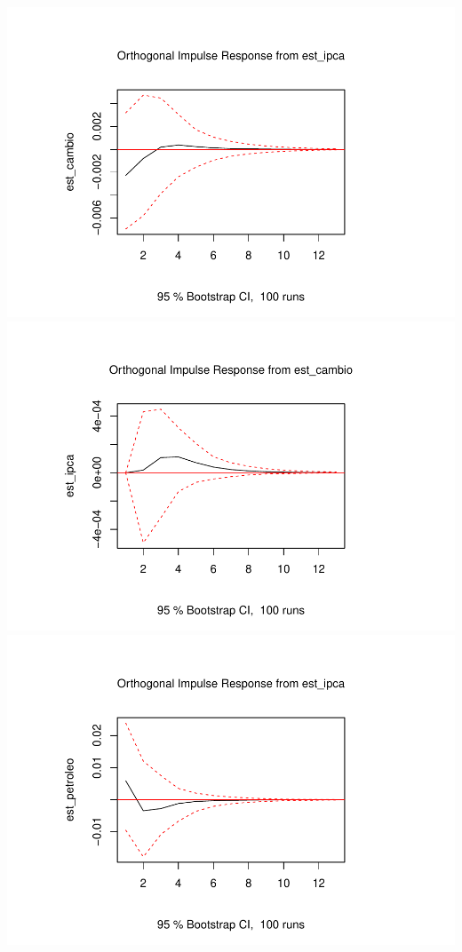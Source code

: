 \documentclass[12pt]{article}
\begin{document}
\includegraphics{teste_en_files/figure-latex/unnamed-chunk-14-1.pdf}
\includegraphics{teste_en_files/figure-latex/unnamed-chunk-14-2.pdf}
\includegraphics{teste_en_files/figure-latex/unnamed-chunk-14-3.pdf}
\end{document}
